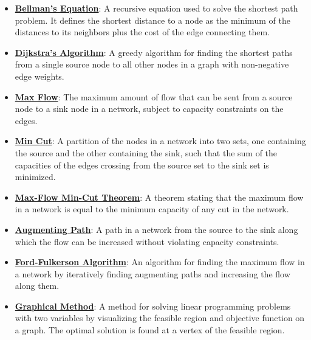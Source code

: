 \documentclass{article}%
\begin{document}
\begin{itemize}[leftmargin=*]
\item \href{https://www.math.purdue.edu/~yipn/421//2024-11-14-NetAppls.pdf#page=16}{\textbf{Bellman's Equation}}: A recursive equation used to solve the shortest path problem. It defines the shortest distance to a node as the minimum of the distances to its neighbors plus the cost of the edge connecting them.%
\item \href{https://www.math.purdue.edu/~yipn/421//2024-11-14-NetAppls.pdf#page=20}{\textbf{Dijkstra's Algorithm}}: A greedy algorithm for finding the shortest paths from a single source node to all other nodes in a graph with non-negative edge weights.%
\item \href{https://www.math.purdue.edu/~yipn/421//2024-11-19-MaxFlowMinCut.pdf#page=1}{\textbf{Max Flow}}: The maximum amount of flow that can be sent from a source node to a sink node in a network, subject to capacity constraints on the edges.%
\item \href{https://www.math.purdue.edu/~yipn/421//2024-11-19-MaxFlowMinCut.pdf#page=2}{\textbf{Min Cut}}: A partition of the nodes in a network into two sets, one containing the source and the other containing the sink, such that the sum of the capacities of the edges crossing from the source set to the sink set is minimized.%
\item \href{https://www.math.purdue.edu/~yipn/421//2024-11-19-MaxFlowMinCut.pdf#page=4}{\textbf{Max-Flow Min-Cut Theorem}}: A theorem stating that the maximum flow in a network is equal to the minimum capacity of any cut in the network.%
\item \href{https://www.math.purdue.edu/~yipn/421//2024-11-19-MaxFlowMinCut.pdf#page=10}{\textbf{Augmenting Path}}: A path in a network from the source to the sink along which the flow can be increased without violating capacity constraints.%
\item \href{https://www.math.purdue.edu/~yipn/421//2024-11-19-MaxFlowMinCut.pdf#page=10}{\textbf{Ford-Fulkerson Algorithm}}: An algorithm for finding the maximum flow in a network by iteratively finding augmenting paths and increasing the flow along them.%
\item \href{https://www.math.purdue.edu/~yipn/421//2024-12-03-Duality.pdf#page=3}{\textbf{Graphical Method}}: A method for solving linear programming problems with two variables by visualizing the feasible region and objective function on a graph. The optimal solution is found at a vertex of the feasible region.%
\end{itemize}
\end{document}
